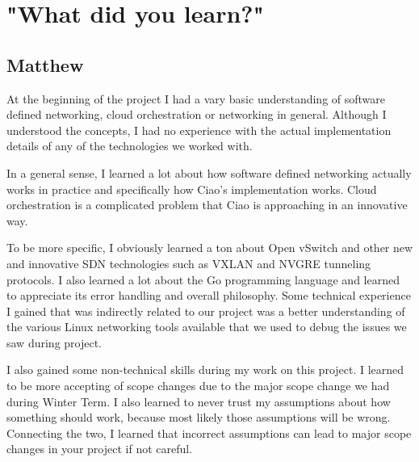 \documentclass[10pt,onecolumn,journal,draftclsnofoot]{IEEEtran}
\begin{document}
\section{"What did you learn?"}


\subsection{Matthew}


At the beginning of the project I had a vary basic understanding of software defined networking, cloud orchestration
or networking in general. Although I understood the concepts, I had no experience with the actual implementation
details of any of the technologies we worked with.

In a general sense, I learned a lot about how software defined networking actually works in practice and specifically
how Ciao's implementation works. Cloud orchestration is a complicated problem that Ciao is approaching in an innovative
way.

To be more specific, I obviously learned a ton about Open vSwitch and other new and innovative SDN technologies such
as VXLAN and NVGRE tunneling protocols. I also learned a lot about the Go programming language and learned to appreciate
its error handling and overall philosophy. Some technical experience I gained that was indirectly related to our project
was a better understanding of the various Linux networking tools available that we used to debug the issues we saw during 
project.


I also gained some non-technical skills during my work on this project. I learned to be more accepting of scope changes
due to the major scope change we had during Winter Term. I also learned to never trust my assumptions about how something
should work, because most likely those assumptions will be wrong. Connecting the two, I learned that incorrect assumptions
can lead to major scope changes in your project if not careful.
\end{document}
